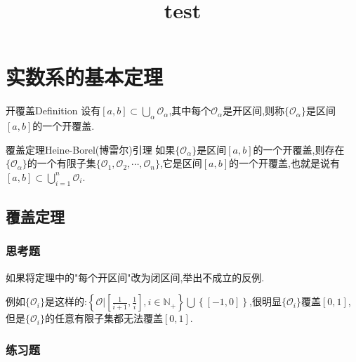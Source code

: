 \documentclass[cn,chinese,founder]{elegantbook}
\title{test}
\begin{document}
    \chapter{实数系的基本定理}
    \begin{definition}{开覆盖}{Definition}
        设有$[a,b]\subset\textstyle\bigcup_\alpha\mathcal{O} _\alpha$,其中每个$\mathcal{O}_\alpha$是开区间,则称$\{\mathcal{O}_\alpha\}$是区间$[a,b]$的一个开覆盖.
    \end{definition}
    \begin{theorem}{覆盖定理}{Heine-Borel(博雷尔)引理}
        如果$\{\mathcal{O}_\alpha\}$是区间$[a,b]$的一个开覆盖,则存在$\{\mathcal{O}_\alpha\}$的一个有限子集$\{\mathcal{O}_1,\mathcal{O}_2,\cdots,\mathcal{O}_n\}$,它是区间$[a,b]$的一个开覆盖,也就是说有$[a,b]\subset\textstyle\bigcup_{i=1}^n\mathcal{O}_i$.
    \end{theorem}
        \section{覆盖定理}
            \subsection{思考题}
            \begin{example}
                如果将定理中的"每个开区间"改为闭区间,举出不成立的反例.
            \end{example}
            \begin{solution}
                例如$\{\mathcal{O}_i\}$是这样的:$\left\{\mathcal{O}\bigg|\left[\frac{1}{i+1},\frac{1}{i}\right],i\in \mathbb{N}_+\right\}\textstyle\bigcup\left\{[-1,0]\right\}$,很明显$\{\mathcal{O}_i\}$覆盖$\left[0,1\right]$,但是$\{\mathcal{O}_i\}$的任意有限子集都无法覆盖$\left[0,1\right]$.
            \end{solution}

            \subsection{练习题}
            \begin{exercise}
                
            \end{exercise}
\end{document}
